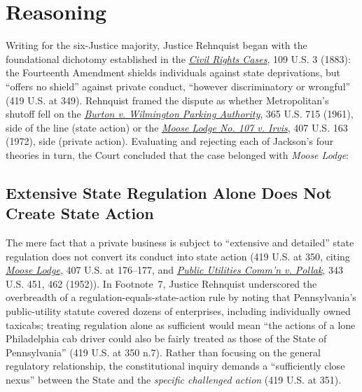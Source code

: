 \documentclass[12pt]{article}
\begin{document}
\section{Reasoning}

Writing for the six-Justice majority, Justice Rehnquist began with the foundational dichotomy established in the \href{https://supreme.justia.com/cases/federal/us/109/3/}{\emph{Civil Rights Cases}}, 109 U.S. 3 (1883): the Fourteenth Amendment shields individuals against state deprivations, but ``offers no shield'' against private conduct, ``however discriminatory or wrongful'' (419 U.S. at 349). Rehnquist framed the dispute as whether Metropolitan's shutoff fell on the \href{https://supreme.justia.com/cases/federal/us/365/715/}{\emph{Burton v. Wilmington Parking Authority}}, 365 U.S. 715 (1961), side of the line (state action) or the \href{https://supreme.justia.com/cases/federal/us/407/163/}{\emph{Moose Lodge No. 107 v. Irvis}}, 407 U.S. 163 (1972), side (private action). Evaluating and rejecting each of Jackson's four theories in turn, the Court concluded that the case belonged with \emph{Moose Lodge}:

\subsection{Extensive State Regulation Alone Does Not Create State Action}
The mere fact that a private business is subject to ``extensive and detailed'' state regulation does not convert its conduct into state action (419 U.S. at 350, citing \href{https://supreme.justia.com/cases/federal/us/407/163/}{\emph{Moose Lodge}}, 407 U.S. at 176--177, and \href{https://supreme.justia.com/cases/federal/us/343/451/}{\emph{Public Utilities Comm'n v. Pollak}}, 343 U.S. 451, 462 (1952)). In Footnote~7, Justice Rehnquist underscored the overbreadth of a regulation-equals-state-action rule by noting that Pennsylvania's public-utility statute covered dozens of enterprises, including individually owned taxicabs; treating regulation alone as sufficient would mean ``the actions of a lone Philadelphia cab driver could also be fairly treated as those of the State of Pennsylvania'' (419 U.S. at 350 n.7). Rather than focusing on the general regulatory relationship, the constitutional inquiry demands a ``sufficiently close nexus'' between the State and the \emph{specific challenged action} (419 U.S. at 351).
\end{document}
